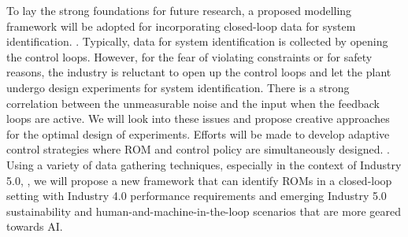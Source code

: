 \documentclass[oneside,11pt,a4paper]{article}
\begin{document}
To lay the strong foundations for future research, a proposed modelling framework will be adopted for incorporating closed-loop data for system identification. \cite{forssell1999closed, van2013closed}. Typically, data for system identification is collected by opening the control loops. However, for the fear of violating constraints or for safety reasons, the industry is reluctant to open up the control loops and let the plant undergo design experiments for system identification. There is a strong correlation between the unmeasurable noise and the input when the feedback loops are active. We will look into these issues and propose creative approaches for the optimal design of experiments. Efforts will be made to develop adaptive control strategies where ROM and control policy are simultaneously designed. \cite{aastrom2008adaptive, landau2011adaptive}. Using a variety of data gathering techniques, especially in the context of Industry 5.0, \cite{mourtzis2022literature,xu2021industry}, we will propose a new framework that can identify ROMs in a closed-loop setting with Industry 4.0 performance requirements and emerging Industry 5.0 sustainability and human-and-machine-in-the-loop scenarios that are more geared towards AI.
\end{document}
